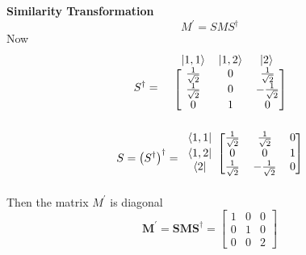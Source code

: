 \begin{enumerate}
	\textbf{Similarity Transformation}
	\begin{equation}
		M^\prime = S M S^\dagger
	\end{equation}
	Now
	\begin{equation}
		S^\dagger =
		 \begin{blockarray}{cccc}
		\ & \ket{1,1} & \ket{1,2} & \ket{2}\\
		\begin{block}{c[ccc]}
		\ & \frac{1}{\sqrt{2}} & 0 & \frac{1}{\sqrt{2}}  \\
		\ & \frac{1}{\sqrt{2}} & 0 & -\frac{1}{\sqrt{2}}  \\
		\ & 0 & 1 & 0  \\
		\end{block}
		\end{blockarray} \\
	\end{equation}
	\begin{equation}
		S = \left(S^\dagger\right)^\dagger = 
 		\begin{blockarray}{cccc}
		\begin{block}{c[ccc]}
		\bra{1,1} & \frac{1}{\sqrt{2}} & \frac{1}{\sqrt{2}} & 0  \\
		\bra{1,2} & 0 & 0 & 1  \\
		\bra{2} & \frac{1}{\sqrt{2}} & -\frac{1}{\sqrt{2}} & 0  \\
		\end{block}
		\end{blockarray} \\
	\end{equation}
	Then the matrix $M^\prime$ is diagonal
	\begin{equation}
		\mathbf{M}^\prime = \mathbf{S}\mathbf{M}\mathbf{S}^\dagger = \left[\begin{matrix}
		1 & 0 & 0 \\ 0 & 1 & 0 \\ 0 & 0 & 2
		\end{matrix}\right]
	\end{equation}

	


	\end{enumerate}
